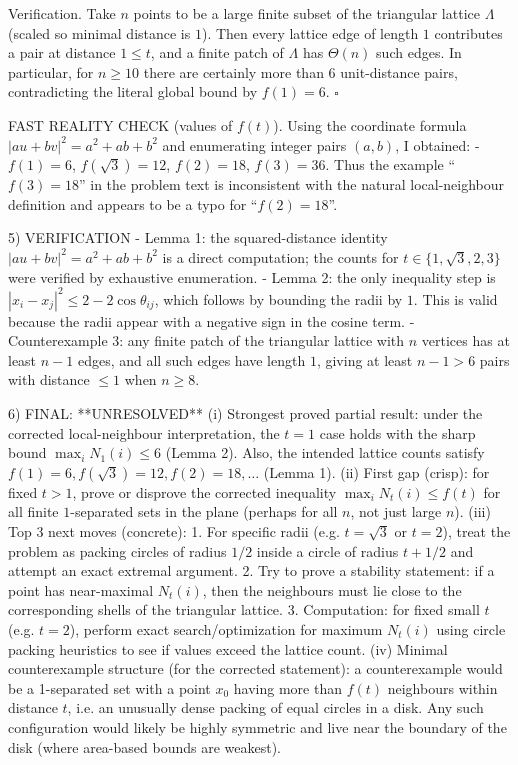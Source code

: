 Verification.
Take $n$ points to be a large finite subset of the triangular lattice $\Lambda$ (scaled so minimal distance is $1$).
Then every lattice edge of length $1$ contributes a pair at distance $1\le t$, and a finite patch of $\Lambda$ has $\Theta(n)$ such edges.
In particular, for $n\ge 10$ there are certainly more than $6$ unit-distance pairs, contradicting the literal global bound by $f(1)=6$. $\square$

FAST REALITY CHECK (values of $f(t)$).
Using the coordinate formula $|a u+b v|^2=a^2+ab+b^2$ and enumerating integer pairs $(a,b)$, I obtained:
- $f(1)=6$, $f(\sqrt3)=12$, $f(2)=18$, $f(3)=36$.
Thus the example ``$f(3)=18$'' in the problem text is inconsistent with the natural local-neighbour definition and appears to be a typo for ``$f(2)=18$''.

5) VERIFICATION
- Lemma 1: the squared-distance identity $|a u+b v|^2=a^2+ab+b^2$ is a direct computation; the counts for $t\in\{1,\sqrt3,2,3\}$ were verified by exhaustive enumeration.
- Lemma 2: the only inequality step is $|x_i-x_j|^2\le 2-2\cos\theta_{ij}$, which follows by bounding the radii by $1$. This is valid because the radii appear with a negative sign in the cosine term.
- Counterexample 3: any finite patch of the triangular lattice with $n$ vertices has at least $n-1$ edges, and all such edges have length $1$, giving at least $n-1>6$ pairs with distance $\le 1$ when $n\ge 8$.

6) FINAL: **UNRESOLVED**
(i) Strongest proved partial result: under the corrected local-neighbour interpretation, the $t=1$ case holds with the sharp bound $\max_i N_1(i)\le 6$ (Lemma 2). Also, the intended lattice counts satisfy $f(1)=6,f(\sqrt3)=12,f(2)=18,\ldots$ (Lemma 1).
(ii) First gap (crisp): for fixed $t>1$, prove or disprove the corrected inequality $\max_i N_t(i)\le f(t)$ for all finite $1$-separated sets in the plane (perhaps for all $n$, not just large $n$).
(iii) Top 3 next moves (concrete):
  1. For specific radii (e.g. $t=\sqrt3$ or $t=2$), treat the problem as packing circles of radius $1/2$ inside a circle of radius $t+1/2$ and attempt an exact extremal argument.
  2. Try to prove a stability statement: if a point has near-maximal $N_t(i)$, then the neighbours must lie close to the corresponding shells of the triangular lattice.
  3. Computation: for fixed small $t$ (e.g. $t=2$), perform exact search/optimization for maximum $N_t(i)$ using circle packing heuristics to see if values exceed the lattice count.
(iv) Minimal counterexample structure (for the corrected statement): a counterexample would be a 1-separated set with a point $x_0$ having more than $f(t)$ neighbours within distance $t$, i.e. an unusually dense packing of equal circles in a disk. Any such configuration would likely be highly symmetric and live near the boundary of the disk (where area-based bounds are weakest).



